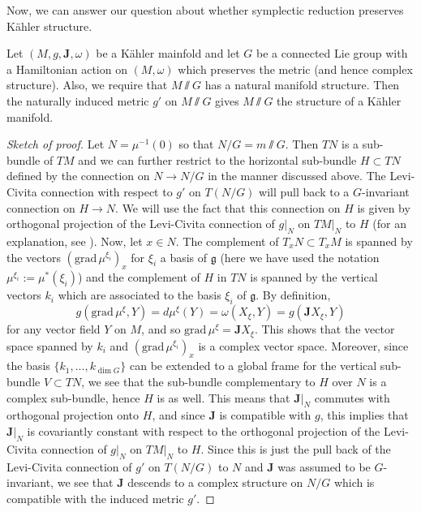 Now, we can answer our question about whether symplectic reduction preserves K\"ahler structure. 
\begin{prop}
  Let $(M,g,\mathbf{J},\omega)$ be a K\"ahler mainfold and let $G$ be a connected Lie group with a Hamiltonian action on $(M,\omega)$ which preserves the metric (and hence complex structure). Also, we require that $M\sslash G$ has a natural manifold structure. Then the naturally induced metric $g'$ on $M\sslash G$ gives $M\sslash G$ the structure of a K\"ahler manifold. 
\end{prop}
\begin{proof}[Sketch of proof]
  Let $N = \mu^{-1}(0)$ so that $N/G = m\sslash G$. Then $TN$ is a sub-bundle of $TM$ and we can further restrict to the horizontal sub-bundle $H\subset TN$ defined by the connection on $N\to N/G$ in the manner discussed above. The Levi-Civita connection with respect to $g'$ on $T(N/G)$ will pull back to a $G$-invariant connection on $H\to N$. We will use the fact that this connection on $H$ is given by orthogonal projection of the Levi-Civita connection of $g\big|_N$ on $TM\big|_N$ to $H$ (for an explanation, see \cite{HKLR}). Now, let $x\in N$. The complement of $T_xN\subset T_xM$ is spanned by the vectors $(\mathrm{grad}\,\mu^{\xi_i})_x$ for $\xi_i$ a basis of $\mathfrak{g}$ (here we have used the notation $\mu^{\xi_i} := \mu^*(\xi_i)$) and the complement of $H$ in $TN$ is spanned by the vertical vectors $k_i$ which are associated to the basis $\xi_i$ of $\mathfrak{g}$. By definition, 
\begin{equation*}
  g(\mathrm{grad}\,\mu^{\xi},Y) = d\mu^\xi(Y) = \omega(X_\xi,Y) = g(\mathbf{J}X_\xi,Y)
\end{equation*}
for any vector field $Y$ on $M$, and so $\mathrm{grad}\,\mu^\xi = \mathbf{J}X_\xi$. This shows that the vector space spanned by $k_i$ and $(\mathrm{grad}\,\mu^{\xi_i})_x$ is a complex vector space. Moreover, since the basis $\{k_1,...,k_{\dim G}\}$ can be extended to a global frame for the vertical sub-bundle $V\subset TN$, we see that the sub-bundle complementary to $H$ over $N$ is a complex sub-bundle, hence $H$ is as well. This means that $\mathbf{J}\big|_N$ commutes with orthogonal projection onto $H$, and since $\mathbf{J}$ is compatible with $g$, this implies that $\mathbf{J}\big|_N$ is covariantly constant with respect to the orthogonal projection of the Levi-Civita connection of $g\big|_N$ on $TM\big|_N$ to $H$. Since this is just the pull back of the Levi-Civita connection of $g'$ on $T(N/G)$ to $N$ and $\mathbf{J}$ was assumed to be $G$-invariant, we see that $\mathbf{J}$ descends to a complex structure on $N/G$ which is compatible with the induced metric $g'$. 
\end{proof}
